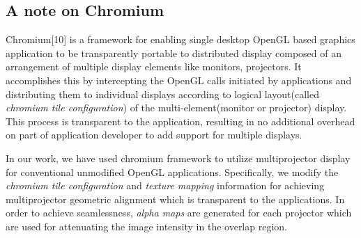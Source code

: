 \documentclass[conference]{/home/pranav/Desktop/Publication_work/latex_class_files/IEEEtran}
\begin{document}
\subsection{A note on Chromium}
Chromium[10] is a framework for enabling single desktop OpenGL based graphics application to be transparently portable to distributed display composed of an arrangement of multiple display elements like monitors, projectors. It accomplishes this by intercepting the OpenGL calls initiated by applications and distributing them to individual displays according to logical layout(called \textit{chromium tile configuration}) of the multi-element(monitor or projector) display. This process is transparent to the application, resulting in no additional overhead on part of application developer to add support for multiple displays. \par
In our work, we have used chromium framework to utilize multiprojector display for conventional unmodified OpenGL applications. Specifically, we modify the \textit{chromium tile configuration} and \textit{texture mapping} information for achieving multiprojector geometric alignment which is transparent to the applications. In order to achieve seamlessness, \textit{alpha maps} are generated for each projector which are used for attenuating the image intensity in the overlap region.
\end{document}
